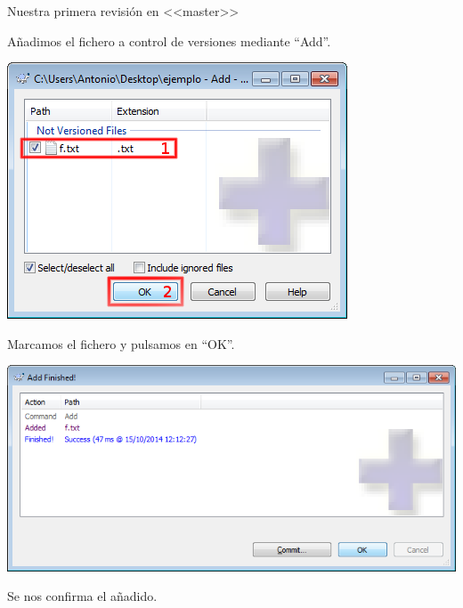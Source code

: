\documentclass[xcolor=svgnames]{beamer}
\begin{document}
\begin{frame}[t]{Nuestra primera revisión en <<master>>}
\begin{overprint}
\begin{center}
      \vfill

      Añadimos el fichero a control de versiones mediante ``Add''.
    \end{center}

    \begin{center}
      \includegraphics[width=\textwidth,height=.6\textheight,keepaspectratio]{tomas/primercommit-01-dlgadd}

      \vfill

      Marcamos el fichero y pulsamos en ``OK''.
    \end{center}

    \begin{center}
      \includegraphics[width=\textwidth,height=.6\textheight,keepaspectratio]{tomas/primercommit-02-success}

      \vfill

      Se nos confirma el añadido.
    \end{center}

    \begin{center}
      \vspace{.15\textheight}


\end{center}
\end{overprint}
\end{frame}
\end{document}
